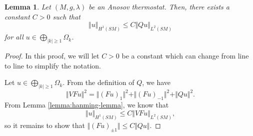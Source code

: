 \documentclass[reqno,12pt,letterpaper]{amsart}
\newtheorem{lemma}[proposition]{Lemma}
\theoremstyle{definition}
\theoremstyle{remark}
\theoremstyle{definition}
\numberwithin{equation}{section}
\begin{document}
\begin{lemma}
Let $(M, g, \lambda)$ be an Anosov thermostat. Then, there exists a constant $C>0$ such that 
\begin{equation*}
\Vert u \Vert_{H^1(SM)}\leq C\Vert Qu \Vert_{L^2(SM)}
\end{equation*}
for all $u\in \bigoplus_{|k|\geq 1}\Omega_k$. 
\end{lemma}
\begin{proof}
In this proof, we will let $C>0$ be a constant which can change from line to line to simplify the notation. 

Let $u\in \bigoplus_{|k|\geq 1}\Omega_k$. From the definition of $Q$, we have
\begin{equation*}
\Vert VF u\Vert^2=\Vert (Fu)_1\Vert^2+\Vert (Fu)_{-1}\Vert^2+\Vert Qu\Vert^2.
\end{equation*}
From Lemma \eqref{lemma:hanming-lemma}, we know that
\begin{equation*}
\Vert u \Vert_{H^1(SM)}\leq C\Vert VF u\Vert_{L^2(SM)},
\end{equation*}
so it remains to show that $\Vert (Fu)_{\pm 1}\Vert \leq C \Vert Q u\Vert$. 


\end{proof}
\end{document}
